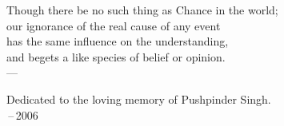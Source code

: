 \thispagestyle{empty}
{}

\vspace*{3cm}

%

%
%
%
%

\begin{center}
Though there be no such thing as Chance in the world; \\
our ignorance of the real cause of any event \\
has the same influence on the understanding, \\
and begets a like species of belief or opinion. \\ \medskip
    --- \cite{hume:1902}
\end{center}

\medskip

\begin{center}
    Dedicated to the loving memory of Pushpinder Singh. \\ \,--\,2006
\end{center}
